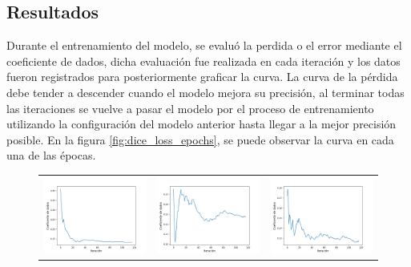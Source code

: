 \subsection{Resultados}
Durante el entrenamiento del modelo, se evaluó la perdida o el error mediante el coeficiente de dados, dicha evaluación fue realizada en cada iteración y los datos fueron registrados para posteriormente graficar la curva. La curva de la pérdida debe tender a descender cuando el modelo mejora su precisión, al terminar todas las iteraciones se vuelve a pasar el modelo por el proceso de entrenamiento utilizando la configuración del modelo anterior hasta llegar a la mejor precisión posible. En la figura \ref{fig:dice_loss_epochs}, se puede observar la curva en cada una de las épocas.
\begin{figure}[h!]
    \centering
    \begin{tabular}{ccc}
        \includegraphics[width=4cm]{../Plots/dl_epoch_0.png} &
        \includegraphics[width=4cm]{../Plots/dl_epoch_1.png} &
        \includegraphics[width=4cm]{../Plots/dl_epoch_2.png} \\


\end{tabular}
\end{figure}
